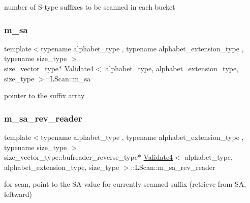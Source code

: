 number of S-\/type suffixes to be scanned in each bucket 

\mbox{\label{struct_validate4_1_1_l_scan_a38f7644fb0e19bc24c83cbcc04f1b01f}} 
\subsubsection{\texorpdfstring{m\+\_\+sa}{m\_sa}}
{\footnotesize\ttfamily template$<$typename alphabet\+\_\+type , typename alphabet\+\_\+extension\+\_\+type , typename size\+\_\+type $>$ \\
\hyperlink{class_validate4_a46ea31a0a4b23f583806792160421d15}{size\+\_\+vector\+\_\+type}$\ast$ \hyperlink{class_validate4}{Validate4}$<$ alphabet\+\_\+type, alphabet\+\_\+extension\+\_\+type, size\+\_\+type $>$\+::L\+Scan\+::m\+\_\+sa\hspace{0.3cm}{\ttfamily [private]}}



pointer to the suffix array 

\mbox{\label{struct_validate4_1_1_l_scan_aa424a1fcc802dbe8556953c1e8d07207}} 
\subsubsection{\texorpdfstring{m\+\_\+sa\+\_\+rev\+\_\+reader}{m\_sa\_rev\_reader}}
{\footnotesize\ttfamily template$<$typename alphabet\+\_\+type , typename alphabet\+\_\+extension\+\_\+type , typename size\+\_\+type $>$ \\
size\+\_\+vector\+\_\+type\+::bufreader\+\_\+reverse\+\_\+type$\ast$ \hyperlink{class_validate4}{Validate4}$<$ alphabet\+\_\+type, alphabet\+\_\+extension\+\_\+type, size\+\_\+type $>$\+::L\+Scan\+::m\+\_\+sa\+\_\+rev\+\_\+reader\hspace{0.3cm}{\ttfamily [private]}}



for scan, point to the S\+A-\/value for currently scanned suffix (retrieve from SA, leftward) 

